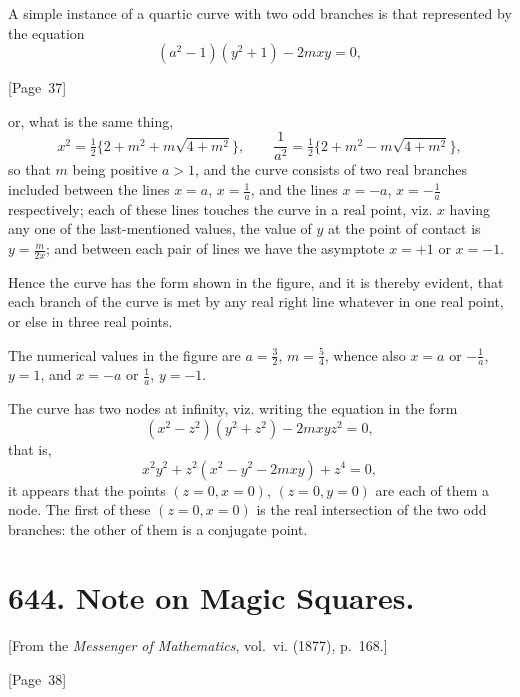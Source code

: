 \documentclass[11pt,a4paper]{article}
\theoremstyle{plain}
\theoremstyle{definition}
\theoremstyle{remark}
\begin{document}
A simple instance of a quartic curve with two odd branches is that
represented by the equation
\[
(a^2 - 1)(y^2 + 1) - 2mxy = 0,
\]

\begin{center}
[Page~37]
\end{center}

or, what is the same thing,
\[
x^2 = \tfrac{1}{2}\{2 + m^2 + m\sqrt{4 + m^2}\}, \qquad
\frac{1}{a^2} = \tfrac{1}{2}\{2 + m^2 - m\sqrt{4 + m^2}\},
\]
so that $m$ being positive $a > 1$, and the curve consists of two real
branches included between the lines $x = a$, $x = \tfrac{1}{a}$, and the
lines $x = -a$, $x = -\tfrac{1}{a}$ respectively; each of these lines
touches the curve in a real point, viz. $x$ having any one of the
last-mentioned values, the value of $y$ at the point of contact is
$y = \tfrac{m}{2x}$; and between each pair of lines we have the asymptote
$x = +1$ or $x = -1$.

Hence the curve has the form shown in the figure, and it is thereby
evident, that each branch of the curve is met by any real right line
whatever in one real point, or else in three real points.

The numerical values in the figure are $a = \tfrac{3}{2}$, $m = \tfrac{5}{4}$,
whence also $x = a$ or $-\tfrac{1}{a}$, $y = 1$, and $x = -a$ or
$\tfrac{1}{a}$, $y = -1$.

The curve has two nodes at infinity, viz. writing the equation in the form
\[
(x^2 - z^2)(y^2 + z^2) - 2mxyz^2 = 0,
\]
that is,
\[
x^2y^2 + z^2(x^2 - y^2 - 2mxy) + z^4 = 0,
\]
it appears that the points $(z=0, x=0)$, $(z=0, y=0)$ are each of them a node.
The first of these $(z=0, x=0)$ is the real intersection of the two odd
branches: the other of them is a conjugate point.


\newpage
\section*{644. Note on Magic Squares.}

[From the \textit{Messenger of Mathematics}, vol.~vi. (1877), p.~168.]

\begin{center}
[Page~38]
\end{center}
\end{document}
